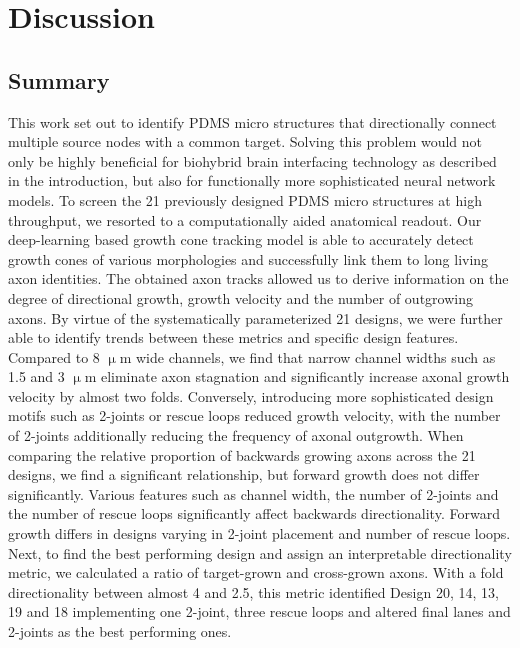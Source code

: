 \section{Discussion}

\subsection{Summary}
This work set out to identify PDMS micro structures that directionally connect
multiple source nodes with a common target. Solving this problem would not only
be highly beneficial for biohybrid brain interfacing technology as described in
the introduction, but also for functionally more sophisticated neural network
models. To screen the 21 previously designed PDMS micro structures at high
throughput, we resorted to a computationally aided anatomical readout. Our
deep-learning based growth cone tracking model is able to accurately detect
growth cones of various morphologies and successfully link them to long living
axon identities. The obtained axon tracks allowed us to derive information on
the degree of directional growth, growth velocity and the number of outgrowing
axons. By virtue of the systematically parameterized 21 designs, we were further
able to identify trends between these metrics and specific design features. \\

Compared to 8 $\upmu$m wide channels, we find that narrow channel widths such as
1.5 and 3 $\upmu$m eliminate axon stagnation and significantly increase axonal
growth velocity by almost two folds. Conversely, introducing more sophisticated
design motifs such as 2-joints or rescue loops reduced growth velocity, with the
number of 2-joints additionally reducing the frequency of axonal outgrowth. When
comparing the relative proportion of backwards growing axons across the 21
designs, we find a significant relationship, but forward growth does not differ
significantly. Various features such as channel width, the number of 2-joints
and the number of rescue loops significantly affect backwards directionality.
Forward growth differs in designs varying in 2-joint placement and number of
rescue loops. Next, to find the best performing design and assign an
interpretable directionality metric, we calculated a ratio of target-grown and
cross-grown axons. With a fold directionality between almost 4 and 2.5, this
metric identified Design 20, 14, 13, 19 and 18 implementing one 2-joint, three
rescue loops and altered final lanes and 2-joints as the best performing ones. \\

